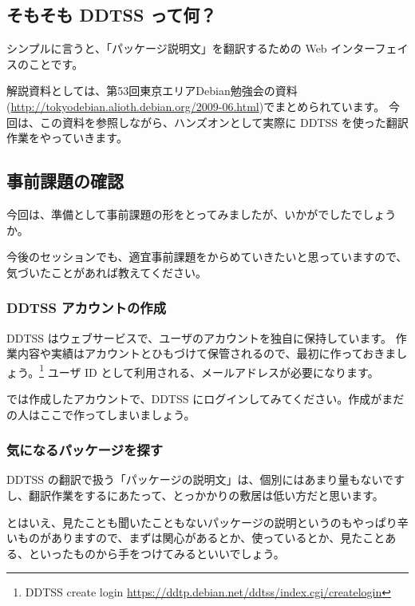 \documentclass[mingoth,a4paper]{jsarticle}
\begin{document}

\subsection{そもそも DDTSS って何？}

シンプルに言うと、「パッケージ説明文」を翻訳するための Web インターフェイスのことです。

解説資料としては、第53回東京エリアDebian勉強会の資料
(\url{http://tokyodebian.alioth.debian.org/2009-06.html})でまとめられています。
今回は、この資料を参照しながら、ハンズオンとして実際に DDTSS を使った翻訳作業をやっていきます。

\subsection{事前課題の確認}

今回は、準備として事前課題の形をとってみましたが、いかがでしたでしょうか。

今後のセッションでも、適宜事前課題をからめていきたいと思っていますので、気づいたことがあれば教えてください。

\subsubsection{DDTSS アカウントの作成}

DDTSS はウェブサービスで、ユーザのアカウントを独自に保持しています。
作業内容や実績はアカウントとひもづけて保管されるので、最初に作っておきましょう。\footnote{DDTSS create login \url{https://ddtp.debian.net/ddtss/index.cgi/createlogin}}
ユーザ ID として利用される、メールアドレスが必要になります。

では作成したアカウントで、DDTSS にログインしてみてください。作成がまだの人はここで作ってしまいましょう。

\subsubsection{気になるパッケージを探す}

DDTSS の翻訳で扱う「パッケージの説明文」は、個別にはあまり量もないですし、翻訳作業をするにあたって、とっかかりの敷居は低い方だと思います。

とはいえ、見たことも聞いたこともないパッケージの説明というのもやっぱり辛いものがありますので、まずは関心があるとか、使っているとか、見たことある、といったものから手をつけてみるといいでしょう。
\end{document}

